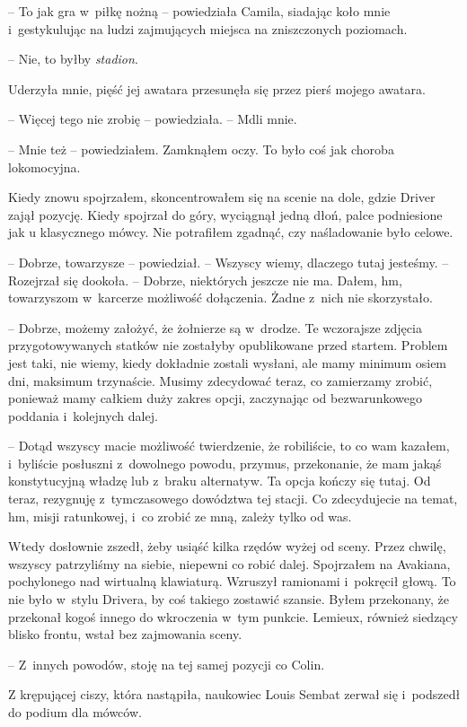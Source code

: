 \documentclass[oneside,polish,12pt,sfheadings]{mwbk}
\begin{document}
-- To jak gra w~piłkę nożną -- powiedziała Camila, siadając koło mnie i~gestykulując na ludzi zajmujących miejsca na zniszczonych poziomach.

-- Nie, to byłby \emph{stadion}.

Uderzyła mnie, pięść jej awatara przesunęła się przez pierś mojego
awatara.

-- Więcej tego nie zrobię -- powiedziała. -- Mdli mnie.

-- Mnie też -- powiedziałem. Zamknąłem oczy. To było coś jak choroba
lokomocyjna.

Kiedy znowu spojrzałem, skoncentrowałem się na scenie na dole, gdzie
Driver zajął pozycję. Kiedy spojrzał do góry, wyciągnął jedną dłoń,
palce podniesione jak u klasycznego mówcy. Nie potrafiłem zgadnąć, czy
naśladowanie było celowe.

-- Dobrze, towarzysze -- powiedział. -- Wszyscy wiemy, dlaczego tutaj
jesteśmy. -- Rozejrzał się dookoła. -- Dobrze, niektórych jeszcze nie ma.
Dałem, hm, towarzyszom w~karcerze możliwość dołączenia. Żadne z~nich nie
skorzystało.

-- Dobrze, możemy założyć, że żołnierze są w~drodze. Te wczorajsze
zdjęcia przygotowywanych statków nie zostałyby opublikowane przed
startem. Problem jest taki, nie wiemy, kiedy dokładnie zostali wysłani,
ale mamy minimum osiem dni, maksimum trzynaście. Musimy zdecydować
teraz, co zamierzamy zrobić, ponieważ mamy całkiem duży zakres opcji,
zaczynając od bezwarunkowego poddania i~kolejnych dalej.

-- Dotąd wszyscy macie możliwość twierdzenie, że robiliście, to co wam
kazałem, i~byliście posłuszni z~dowolnego powodu, przymus, przekonanie,
że mam jakąś konstytucyjną władzę lub z~braku alternatyw. Ta opcja
kończy się tutaj. Od teraz, rezygnuję z~tymczasowego dowództwa tej
stacji. Co zdecydujecie na temat, hm, misji ratunkowej, i~co zrobić ze
mną, zależy tylko od was.

Wtedy dosłownie zszedł, żeby usiąść kilka rzędów wyżej od sceny. Przez
chwilę, wszyscy patrzyliśmy na siebie, niepewni co robić dalej.
Spojrzałem na Avakiana, pochylonego nad wirtualną klawiaturą. Wzruszył
ramionami i~pokręcił głową. To nie było w~stylu Drivera, by coś takiego
zostawić szansie. Byłem przekonany, że przekonał kogoś innego do
wkroczenia w~tym punkcie. Lemieux, również siedzący blisko frontu, wstał
bez zajmowania sceny.

-- Z~innych powodów, stoję na tej samej pozycji co Colin.

Z krępującej ciszy, która nastąpiła, naukowiec Louis Sembat zerwał się i~podszedł do podium dla mówców.
\end{document}
